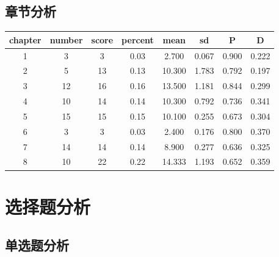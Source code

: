 \documentclass[hyperref,adobefonts]{ctexart}
\begin{document}
\subsection{章节分析}

\begin{longtable}{c|c|c|c|c|c|c|c}
\hline
chapter & number & score & percent & mean & sd & P & D\\
\hline
1 & 3 & 3 & 0.03 & 2.700 & 0.067 & 0.900 & 0.222\\
\hline
2 & 5 & 13 & 0.13 & 10.300 & 1.783 & 0.792 & 0.197\\
\hline
3 & 12 & 16 & 0.16 & 13.500 & 1.181 & 0.844 & 0.299\\
\hline
4 & 10 & 14 & 0.14 & 10.300 & 0.792 & 0.736 & 0.341\\
\hline
5 & 15 & 15 & 0.15 & 10.100 & 0.255 & 0.673 & 0.304\\
\hline
6 & 3 & 3 & 0.03 & 2.400 & 0.176 & 0.800 & 0.370\\
\hline
7 & 14 & 14 & 0.14 & 8.900 & 0.277 & 0.636 & 0.325\\
\hline
8 & 10 & 22 & 0.22 & 14.333 & 1.193 & 0.652 & 0.359\\
\hline
\end{longtable}

\section{选择题分析}

\subsection{单选题分析}
\end{document}
